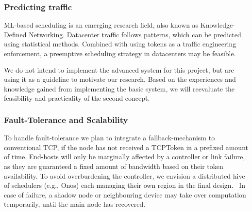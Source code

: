 \subsubsection{Predicting traffic}
ML-based scheduling is an emerging research field, also known as Knowledge-Defined Networking. Datacenter traffic follows patterns, which can be predicted using statistical methods.
Combined with using tokens as a traffic engineering enforcement, a preemptive scheduling strategy in datacenters may be feasible. 

We do not intend to implement the advanced system for this project, but are using it as a guideline to motivate our research. Based on the experiences and knowledge gained from implementing the basic system, we will reevaluate the feasibility and practicality of the second concept.



\subsubsection{Fault-Tolerance and Scalability}
To handle fault-tolerance we plan to integrate a fallback-mechanism to conventional TCP, if the node has not received a TCPToken in a prefixed amount of time. End-hosts will only be marginally affected by a controller or link failure, as they are guaranteed a fixed amount of bandwidth based on their token availability.
To avoid overburdening the controller, we envision a distributed hive of schedulers (e.g., Onos) each managing their own region in the final design.~\cite{onos} In case of failure, a shadow node or neighbouring device may take over computation temporarily, until the main node has recovered.~\cite{disco}
